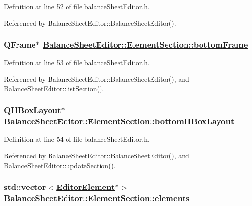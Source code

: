 Definition at line 52 of file balance\-Sheet\-Editor.h.

Referenced by Balance\-Sheet\-Editor::Balance\-Sheet\-Editor().\hypertarget{structBalanceSheetEditor_1_1ElementSection_o4}{
\subsubsection[bottomFrame]{\setlength{\rightskip}{0pt plus 5cm}QFrame$\ast$ \hyperlink{structBalanceSheetEditor_1_1ElementSection_o4}{Balance\-Sheet\-Editor::Element\-Section::bottom\-Frame}}}
\label{structBalanceSheetEditor_1_1ElementSection_o4}


Definition at line 53 of file balance\-Sheet\-Editor.h.

Referenced by Balance\-Sheet\-Editor::Balance\-Sheet\-Editor(), and Balance\-Sheet\-Editor::list\-Section().\hypertarget{structBalanceSheetEditor_1_1ElementSection_o5}{
\subsubsection[bottomHBoxLayout]{\setlength{\rightskip}{0pt plus 5cm}QHBox\-Layout$\ast$ \hyperlink{structBalanceSheetEditor_1_1ElementSection_o5}{Balance\-Sheet\-Editor::Element\-Section::bottom\-HBox\-Layout}}}
\label{structBalanceSheetEditor_1_1ElementSection_o5}


Definition at line 54 of file balance\-Sheet\-Editor.h.

Referenced by Balance\-Sheet\-Editor::Balance\-Sheet\-Editor(), and Balance\-Sheet\-Editor::update\-Section().\hypertarget{structBalanceSheetEditor_1_1ElementSection_o8}{
\subsubsection[elements]{\setlength{\rightskip}{0pt plus 5cm}std::vector$<$\hyperlink{classEditorElement}{Editor\-Element}$\ast$$>$ \hyperlink{structBalanceSheetEditor_1_1ElementSection_o8}{Balance\-Sheet\-Editor::Element\-Section::elements}}}
\label{structBalanceSheetEditor_1_1ElementSection_o8}


